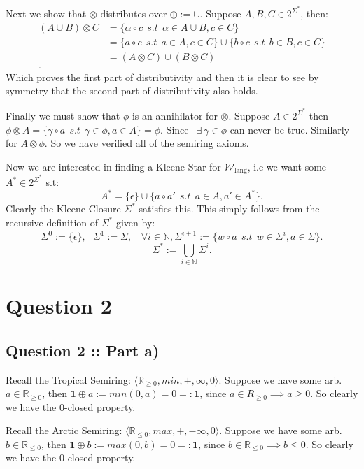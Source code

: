 \documentclass[a4paper]{article}
\begin{document}
Next we show that $\otimes$ distributes over $\oplus := \cup $.
Suppose $A, B, C \in 2^{\Sigma^*}$, then:
\begin{align*}
         (A \cup B) \otimes C &=  \{\alpha \circ c ~~s.t~~ \alpha \in A\cup B, c \in C\} \\ 
    &=  \{a\circ c ~~s.t~~ a\in A, c\in C\}  \cup \{b \circ c ~~s.t~~ b\in B, c\in C\} \\ 
    &=  (A \otimes C) \cup (B \otimes C)\\ 
.
\end{align*}
Which proves the first part of distributivity and then it is clear to see by symmetry
that the second part of distributivity also holds.

Finally we must show that $\phi$ is an annihilator for $\otimes$.
Suppose $A \in 2^{\Sigma^*}$ then $\phi \otimes A = \{\gamma \circ a ~~s.t~~ \gamma \in \phi, a \in A\} = \phi$.
Since $~~\exists~ \gamma \in \phi$ can never be true. Similarly for $A \otimes \phi$.
So we have verified all of the semiring axioms.

Now we are interested in finding a Kleene Star for $\mathcal{W}_{\text{lang}}$, i.e we want some $A^* \in 2^{\Sigma^*}$ s.t:
\[
A^* = \{\epsilon\} \cup \{a \circ a' ~~s.t~~ a \in A, a' \in A^*\} 
.\]
Clearly the Kleene Closure $\Sigma^*$ satisfies this.
This simply follows from the recursive definition of $\Sigma^*$ given by:
\[
\Sigma^0 := \{\epsilon\}, ~ ~ ~ \Sigma^1 := \Sigma, ~ ~ ~ ~\forall i \in \mathbb{N}, \Sigma^{i+1} := \{w \circ a ~~s.t~~ w \in \Sigma^{i}, a \in \Sigma\} 
.\]
\[
\Sigma^* := \bigcup_{i \in  \mathbb{N}}  \Sigma^i
.\]

\section*{Question 2}

\subsection*{Question 2 :: Part a)}
Recall the Tropical Semiring: $\langle \mathbb{R}_{\ge 0}, min, +, \infty, 0\rangle$.
Suppose we have some arb. $a \in \mathbb{R}_{\ge 0}$, then $\bm{1} \oplus a := min(0, a) = 0 =: \bm{1}$,
since $a \in R_{\ge 0} \implies a\ge 0$. So clearly we have the 0-closed property.

Recall the Arctic Semiring: $\langle \mathbb{R}_{\le 0}, max, +, -\infty, 0 \rangle$.
Suppose we have some arb. $b \in \mathbb{R}_{\le 0}$, then $\bm{1} \oplus b:= max(0, b) = 0 =: \bm{1}$,
since $b \in \mathbb{R}_{\le 0} \implies b \le 0$. So clearly we have the 0-closed property.
\end{document}
